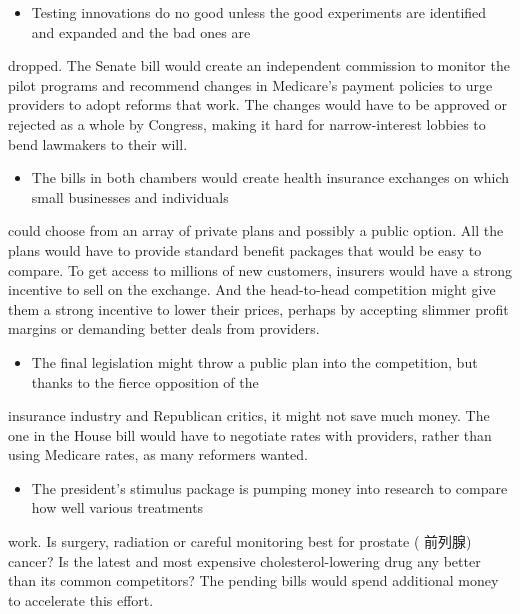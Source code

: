\documentclass[UTF8,11pt]{ctexart}
\begin{document}
\begin{itemize}[leftmargin=2em,itemsep=.2em,topsep=.4em]\item[J.] Testing innovations do no good unless the good experiments are identified and expanded and the bad ones are
\end{itemize}

dropped. The Senate bill would create an independent commission to monitor the pilot programs and recommend changes in Medicare’s payment policies to urge providers to adopt reforms that work. The changes would have to be approved or rejected as a whole by Congress, making it hard for narrow-interest lobbies to bend lawmakers to their will.


\begin{itemize}[leftmargin=2em,itemsep=.2em,topsep=.4em]\item[K.] The bills in both chambers would create health insurance exchanges on which small businesses and individuals
\end{itemize}

could choose from an array of private plans and possibly a public option. All the plans would have to provide standard benefit packages that would be easy to compare. To get access to millions of new customers, insurers would have a strong incentive to sell on the exchange. And the head-to-head competition might give them a strong incentive to lower their prices, perhaps by accepting slimmer profit margins or demanding better deals from providers.


\begin{itemize}[leftmargin=2em,itemsep=.2em,topsep=.4em]\item[L.] The final legislation might throw a public plan into the competition, but thanks to the fierce opposition of the
\end{itemize}

insurance industry and Republican critics, it might not save much money. The one in the House bill would have to negotiate rates with providers, rather than using Medicare rates, as many reformers wanted.


\begin{itemize}[leftmargin=2em,itemsep=.2em,topsep=.4em]\item[M.] The president’s stimulus package is pumping money into research to compare how well various treatments
\end{itemize}

work. Is surgery, radiation or careful monitoring best for prostate ( 前列腺) cancer? Is the latest and most expensive cholesterol-lowering drug any better than its common competitors? The pending bills would spend additional money to accelerate this effort.
\end{document}
